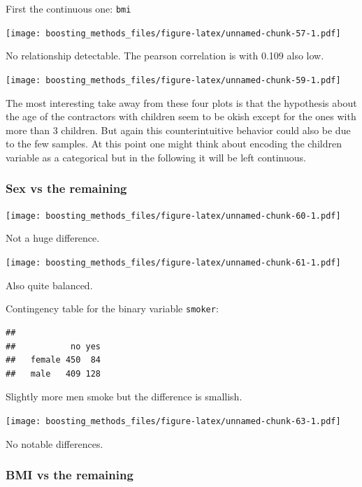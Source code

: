 \documentclass[
]{book}
\newenvironment{Shaded}{\begin{snugshade}}{\end{snugshade}}
\newcommand{\CommentTok}[1]{\textcolor[rgb]{0.56,0.35,0.01}{\textit{#1}}}
\newcommand{\FunctionTok}[1]{\textcolor[rgb]{0.00,0.00,0.00}{#1}}
\newcommand{\NormalTok}[1]{#1}
\newcommand{\SpecialCharTok}[1]{\textcolor[rgb]{0.00,0.00,0.00}{#1}}
\begin{document}
First the continuous one: \texttt{bmi}

\texttt{[image: boosting\_methods\_files/figure-latex/unnamed-chunk-57-1.pdf]}

No relationship detectable. The pearson correlation is with 0.109 also low.

\texttt{[image: boosting\_methods\_files/figure-latex/unnamed-chunk-59-1.pdf]}

The most interesting take away from these four plots is that the hypothesis about the age of the contractors with children seem to be okish except for the ones with more than 3 children. But again this counterintuitive behavior could also be due to the few samples. At this point one might think about encoding the children variable as a categorical but in the following it will be left continuous.

\hypertarget{sex-vs-the-remaining}{%
\subsubsection{Sex vs the remaining}\label{sex-vs-the-remaining}}

\texttt{[image: boosting\_methods\_files/figure-latex/unnamed-chunk-60-1.pdf]}

Not a huge difference.

\texttt{[image: boosting\_methods\_files/figure-latex/unnamed-chunk-61-1.pdf]}

Also quite balanced.

Contingency table for the binary variable \texttt{smoker}:

\begin{Shaded}
\end{Shaded}

\begin{verbatim}
##         
##           no yes
##   female 450  84
##   male   409 128
\end{verbatim}

Slightly more men smoke but the difference is smallish.

\texttt{[image: boosting\_methods\_files/figure-latex/unnamed-chunk-63-1.pdf]}

No notable differences.

\hypertarget{bmi-vs-the-remaining}{%
\subsubsection{BMI vs the remaining}\label{bmi-vs-the-remaining}}
\end{document}
